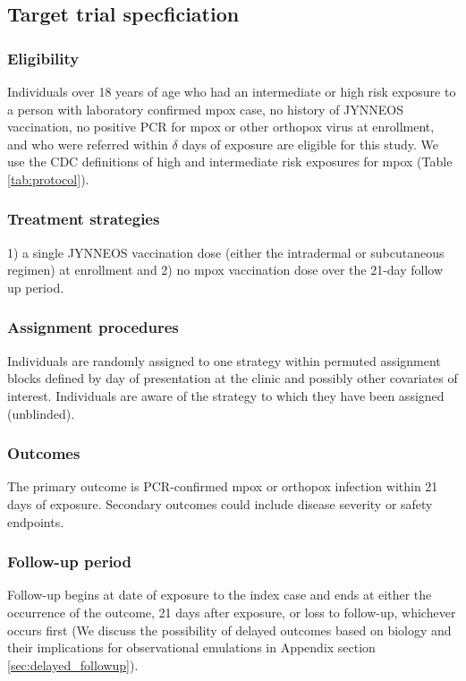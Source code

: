 \begin{appendix}
    \subsection{Target trial specficiation}\label{sec:trial_spec}
    \subsubsection*{Eligibility}

    Individuals over 18 years of age who had an intermediate or high risk exposure to a person with laboratory confirmed mpox case, no history of JYNNEOS vaccination, no positive PCR for mpox or other orthopox virus at enrollment, and who were referred within $\delta$ days of exposure are eligible for this study. We use the CDC definitions of high and intermediate risk exposures \cite{cdc_mpox_2022} for mpox (Table \ref{tab:protocol}).

    \subsubsection*{Treatment strategies}
    1) a single JYNNEOS vaccination dose (either the intradermal or subcutaneous regimen) at enrollment and 2) no mpox vaccination dose over the 21-day follow up period. 

    \subsubsection*{Assignment procedures}
    Individuals are randomly assigned to one strategy within permuted assignment blocks defined by day of presentation at the clinic and possibly other covariates of interest. Individuals are aware of the strategy to which they have been assigned (unblinded).
    
    \subsubsection*{Outcomes}
    The primary outcome is PCR-confirmed mpox or orthopox infection within 21 days of exposure. Secondary outcomes could include disease severity or safety endpoints. 

    \subsubsection*{Follow-up period}
    Follow-up begins at date of exposure to the index case and ends at either the occurrence of the outcome, 21 days after exposure, or loss to follow-up, whichever occurs first (We discuss the possibility of delayed outcomes based on biology and their implications for observational emulations in Appendix section \ref{sec:delayed_followup}).


\end{appendix}
